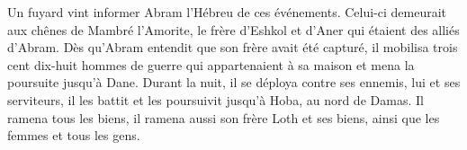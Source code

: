 Un fuyard vint informer Abram l’Hébreu de ces événements.
	Celui-ci demeurait aux chênes de Mambré l’Amorite,
	le frère d’Eshkol et d’Aner qui étaient des alliés d’Abram.
Dès qu’Abram entendit que son frère avait été capturé,
	il mobilisa trois cent dix-huit hommes de guerre
		qui appartenaient à sa maison
	et mena la poursuite jusqu’à Dane.
Durant la nuit, il se déploya contre ses ennemis, lui et ses serviteurs,
	il les battit et les poursuivit jusqu’à Hoba, au nord de Damas.
Il ramena tous les biens,
	il ramena aussi son frère Loth et ses biens,
	ainsi que les femmes et tous les gens.

